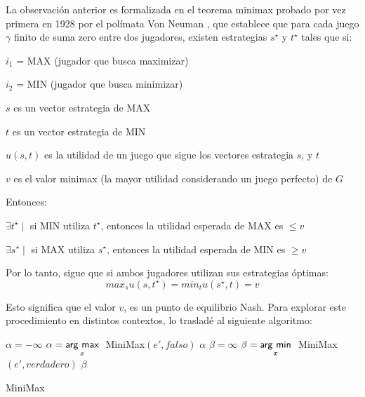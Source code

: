 La observación anterior es formalizada en el teorema minimax probado por vez primera en 1928 por el polímata Von Neuman\autocite[5]{hajiaghayi_28._2011-1} , que establece que para cada juego $\gamma$ finito de suma zero entre dos jugadores, existen estrategias $s^\star$ y $t^\star$ tales que si: 
\begin{enumitem}
\item $i_{1}$ = MAX (jugador que busca maximizar)
\item $i_{2}$ = MIN (jugador que busca minimizar)
\item $s$ es un vector estrategia de MAX
\item $t$ es un vector estrategia de MIN
\item $u(s,t)$ es la utilidad de un juego que sigue los vectores estrategia $s$, y $t$
\item $v$ es el valor minimax (la mayor utilidad considerando un juego perfecto) de $G$
\end{enumitem}

Entonces: 
\begin{enumitem}
\item $\exists t^\star \mid$ si MIN utiliza $t^\star$, entonces la utilidad esperada de MAX es $\leq v$ 
\item $\exists s^\star \mid$ si MAX utiliza $s^\star$, entonces la utilidad esperada de MIN es $\geq v$ 
\end{enumitem}

Por lo tanto, sigue que si ambos jugadores utilizan sus estrategias óptimas:
\begin{equation}
max_{s}u(s,t^\star) = min_{t}u(s^\star,t) = v
\end{equation}

Esto significa que el valor $v$, es un punto de equilibrio Nash\autocite[6]{hajiaghayi_28._2011-1}.
Para explorar este procedimiento en distintos contextos, lo trasladé al siguiente algoritmo\autocite[2]{weibul_game_2011}: 
\begin{algorithm}
\begin{algorithmic}
  \State {}
  \State {}
  \Else
  \State {}
  \EndIf
  \Else
  \State $\alpha = -\infty$
  \State $\alpha = \underset{x}{\operatorname{\mathsf{arg}}\,\operatorname{\mathsf{max}}}\;$ MiniMax$(e', falso)$
  \EndFor
  \State \Return  $\alpha$
  \Else
  \State $\beta = \infty$
  \State $\beta = \underset{x}{\operatorname{\mathsf{arg}}\,\operatorname{\mathsf{min}}}\;$ MiniMax$(e', verdadero)$
  \EndFor
  \State \Return  $\beta$
  \EndIf
  \EndIf
\EndProcedure
\end{algorithmic}
\caption{MiniMax\label{alg:MiniMax}}
\end{algorithm}

